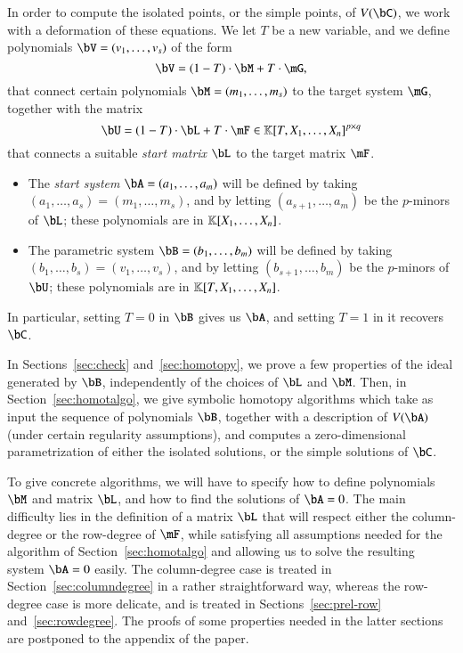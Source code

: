 In order to compute the isolated points, or the simple points, of
$V(\bC)$, we work with a deformation of these equations.  We let $T$ be a
new variable, and we define 
polynomials $\bV=(v_1,\dots,v_s)$ of the form
\begin{equation}\label{eqdef:bV}
\bV = (1-T) \cdot \bM + T \cdot \mG,  
\end{equation}
that connect certain polynomials $\bM=(m_1,\dots,m_s)$ to the target
system $\mG$, together with 
the matrix
\begin{equation}\label{eqdef:bU}
\bU = (1-T)\cdot \bL + T \cdot \mF \in \KK[T, X_1,\dots,X_n]^{p \times q}  
\end{equation}
that connects a suitable \emph{start matrix} $\bL$ to the target matrix $\mF$.
\begin{itemize}
\item The {\em start system} $\bA=(a_1,\dots,a_m)$ will be defined by
  taking $(a_1,\dots,a_s) = (m_1,\dots,m_s)$, and by letting
  $(a_{s+1},\dots,a_m)$ be the $p$-minors of $\bL$; these polynomials 
  are in $\mathbb{K}[X_1,\dots,X_n]$. 
\item The parametric system $\bB=(b_1,\dots,b_m)$ will be defined by
  taking $(b_1,\dots,b_s) = (v_1,\dots,v_s)$, and by letting
  $(b_{s+1},\dots,b_m)$ be the $p$-minors of $\bU$; these polynomials 
  are in $\mathbb{K}[T,X_1,\dots,X_n]$. 
\end{itemize}
In particular, setting $T=0$ in $\bB$ gives us $\bA$, and 
setting $T=1$ in it recovers $\bC$.

In Sections~\ref{sec:check} and~\ref{sec:homotopy}, we prove a few
properties of the ideal generated by $\bB$, independently of the
choices of $\bL$ and $\bM$.  Then, in Section~\ref{sec:homotalgo}, we
give symbolic homotopy algorithms which take as input the sequence of
polynomials $\bB$, together with a description of $V(\bA)$ (under
certain regularity assumptions), and computes a zero-dimensional
parametrization of either the isolated solutions, or the simple
solutions of $\bC$. %

To give concrete algorithms, we will have to specify how to define
polynomials $\bM$ and matrix $\bL$, and how to find the solutions of 
$\bA=0$.
The main difficulty lies in the definition of a matrix
$\bL$ that will respect either the column-degree or the row-degree of
$\mF$, while satisfying all assumptions needed for the algorithm of
Section~\ref{sec:homotalgo} and allowing us to solve
the resulting system $\bA=0$ easily.
  The column-degree case is treated in
Section~\ref{sec:columndegree} in a rather straightforward way,
whereas the row-degree case is more delicate, and is treated in
Sections~\ref{sec:prel-row} and~\ref{sec:rowdegree}. The proofs of
some properties needed in the latter sections are postponed to the
appendix of the paper.


